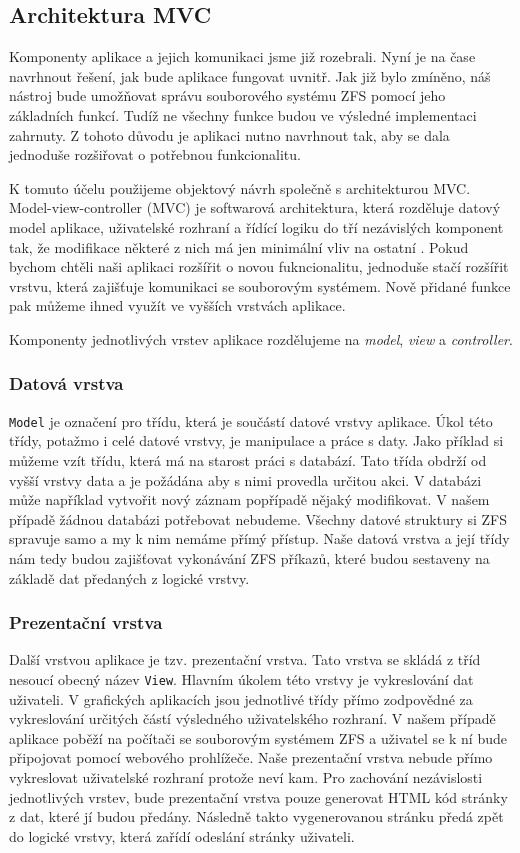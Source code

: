     \subsection{Architektura MVC}
    Komponenty aplikace a jejich komunikaci jsme již rozebrali. Nyní je na čase navrhnout řešení, jak bude aplikace fungovat uvnitř. Jak již bylo zmíněno, náš nástroj bude umožňovat správu souborového systému ZFS pomocí jeho základních funkcí. Tudíž ne všechny funkce budou ve výsledné implementaci zahrnuty. Z tohoto důvodu je aplikaci nutno navrhnout tak, aby se dala jednoduše rozšiřovat o potřebnou funkcionalitu.

    K tomuto účelu použijeme objektový návrh společně s architekturou MVC. Model-view-controller (MVC) je softwarová architektura, která rozděluje datový model aplikace, uživatelské rozhraní a řídící logiku do tří nezávislých komponent tak, že modifikace některé z nich má jen minimální vliv na ostatní \cite{mvc}. Pokud bychom chtěli naši aplikaci rozšířit o novou fukncionalitu, jednoduše stačí rozšířit vrstvu, která zajišťuje komunikaci se souborovým systémem. Nově přidané funkce pak můžeme ihned využít ve vyšších vrstvách aplikace.

    Komponenty jednotlivých vrstev aplikace rozdělujeme na \emph{model}, \emph{view} a \emph{controller}.

        \subsubsection{Datová vrstva}
        \verb|Model| je označení pro třídu, která je součástí datové vrstvy aplikace. Úkol této třídy, potažmo i celé datové vrstvy, je manipulace a práce s daty. Jako příklad si můžeme vzít třídu, která má na starost práci s databází. Tato třída obdrží od vyšší vrstvy data a je požádána aby s nimi provedla určitou akci. V databázi může například vytvořit nový záznam popřípadě nějaký modifikovat. V našem případě žádnou databázi potřebovat nebudeme. Všechny datové struktury si ZFS spravuje samo a my k nim nemáme přímý přístup. Naše datová vrstva a její třídy nám tedy budou zajišťovat vykonávání ZFS příkazů, které budou sestaveny na základě dat předaných z logické vrstvy.
        \subsubsection{Prezentační vrstva}
        Další vrstvou aplikace je tzv. prezentační vrstva. Tato vrstva se skládá z tříd nesoucí obecný název \verb|View|. Hlavním úkolem této vrstvy je vykreslování dat uživateli. V grafických aplikacích jsou jednotlivé třídy přímo zodpovědné za vykreslování určitých částí výsledného uživatelského rozhraní. V našem případě aplikace poběží na počítači se souborovým systémem ZFS a uživatel se k ní bude připojovat pomocí webového prohlížeče. Naše prezentační vrstva nebude přímo vykreslovat uživatelské rozhraní protože neví kam. Pro zachování nezávislosti jednotlivých vrstev, bude prezentační vrstva pouze generovat HTML kód stránky z dat, které jí budou předány. Následně takto vygenerovanou stránku předá zpět do logické vrstvy, která zařídí odeslání stránky uživateli.
